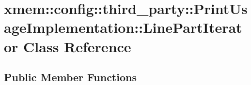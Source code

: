 \hypertarget{classxmem_1_1config_1_1third__party_1_1_print_usage_implementation_1_1_line_part_iterator}{\section{xmem\-:\-:config\-:\-:third\-\_\-party\-:\-:Print\-Usage\-Implementation\-:\-:Line\-Part\-Iterator Class Reference}
\label{classxmem_1_1config_1_1third__party_1_1_print_usage_implementation_1_1_line_part_iterator}
}
\subsection*{Public Member Functions}
